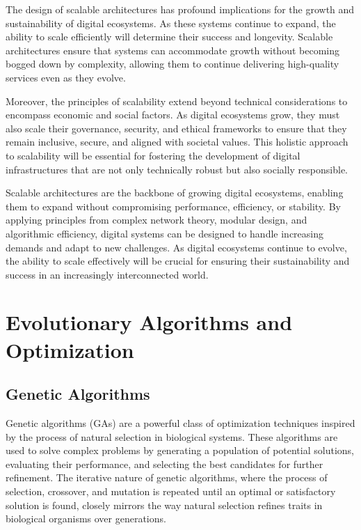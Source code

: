 \documentclass[12pt,twoside]{article}
\begin{document}
The design of scalable architectures has profound implications for the growth and sustainability of digital ecosystems. As these systems continue to expand, the ability to scale efficiently will determine their success and longevity. Scalable architectures ensure that systems can accommodate growth without becoming bogged down by complexity, allowing them to continue delivering high-quality services even as they evolve.

Moreover, the principles of scalability extend beyond technical considerations to encompass economic and social factors. As digital ecosystems grow, they must also scale their governance, security, and ethical frameworks to ensure that they remain inclusive, secure, and aligned with societal values. This holistic approach to scalability will be essential for fostering the development of digital infrastructures that are not only technically robust but also socially responsible.

Scalable architectures are the backbone of growing digital ecosystems, enabling them to expand without compromising performance, efficiency, or stability. By applying principles from complex network theory, modular design, and algorithmic efficiency, digital systems can be designed to handle increasing demands and adapt to new challenges. As digital ecosystems continue to evolve, the ability to scale effectively will be crucial for ensuring their sustainability and success in an increasingly interconnected world.

\section{Evolutionary Algorithms and Optimization}

\subsection{Genetic Algorithms}

Genetic algorithms (GAs) are a powerful class of optimization techniques inspired by the process of natural selection in biological systems. These algorithms are used to solve complex problems by generating a population of potential solutions, evaluating their performance, and selecting the best candidates for further refinement. The iterative nature of genetic algorithms, where the process of selection, crossover, and mutation is repeated until an optimal or satisfactory solution is found, closely mirrors the way natural selection refines traits in biological organisms over generations.
\end{document}
